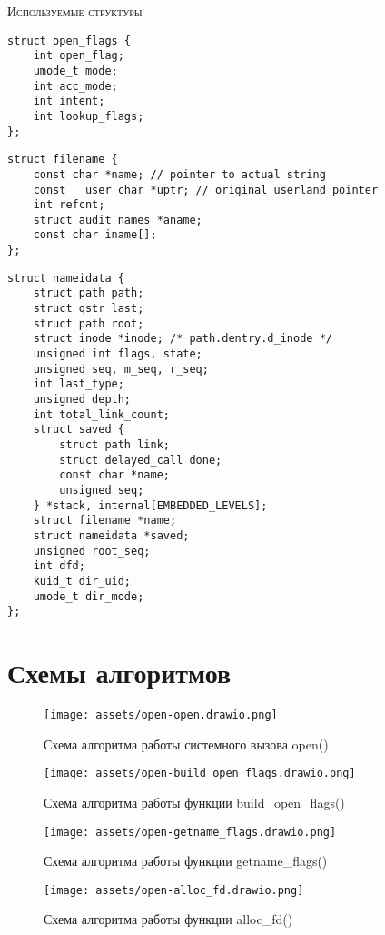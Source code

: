 \textsc{\huge Используемые структуры}
\begin{lstlisting}[caption={\text{Структура open\_flags}}]
struct open_flags {
	int open_flag;
	umode_t mode;
	int acc_mode;
	int intent;
	int lookup_flags;
};
\end{lstlisting}

\begin{lstlisting}[caption={\text{Структура filename}}]
struct filename {
	const char *name; // pointer to actual string
	const __user char *uptr; // original userland pointer
	int refcnt;
	struct audit_names *aname;
	const char iname[];
};	
\end{lstlisting}

\begin{lstlisting}[caption={\text{Структура nameidata}}]
struct nameidata {
	struct path	path;
	struct qstr	last;
	struct path	root;
	struct inode *inode; /* path.dentry.d_inode */
	unsigned int flags, state;
	unsigned seq, m_seq, r_seq;
	int last_type;
	unsigned depth;
	int total_link_count;
	struct saved {
		struct path link;
		struct delayed_call done;
		const char *name;
		unsigned seq;
	} *stack, internal[EMBEDDED_LEVELS];
	struct filename	*name;
	struct nameidata *saved;
	unsigned root_seq;
	int dfd;
	kuid_t dir_uid;
	umode_t dir_mode;
};	
\end{lstlisting}

\chapter*{Схемы алгоритмов}
\begin{figure}[H]
	\centering
	\texttt{[image: assets/open-open.drawio.png]}
	\caption{Схема алгоритма работы системного вызова open()}
\end{figure}

\begin{figure}[H]
	\centering
	\texttt{[image: assets/open-build\_open\_flags.drawio.png]}
	\caption{Схема алгоритма работы функции build\_open\_flags()}
\end{figure}

\begin{figure}[H]
	\centering
	\texttt{[image: assets/open-getname\_flags.drawio.png]}
	\caption{Схема алгоритма работы функции getname\_flags()}
\end{figure}

\begin{figure}[H]
	\centering
	\texttt{[image: assets/open-alloc\_fd.drawio.png]}
	\caption{Схема алгоритма работы функции alloc\_fd()}
\end{figure}

